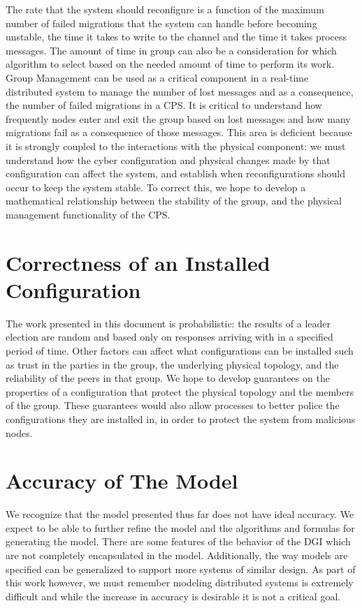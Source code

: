  The rate that the system should reconfigure is a function of the maximum number of failed migrations that the system can handle before becoming unstable, the time it takes to write to the channel and the time it takes process messages. The amount of time in group can also be a consideration for which algorithm to select based on the needed amount of time to perform its work. Group Management can be used as a critical component in a real-time distributed system to manage the number of lost messages and as a consequence, the number of failed migrations in a CPS. It is critical to understand how frequently nodes enter and exit the group based on lost messages and how many migrations fail as a consequence of those messages. This area is deficient because it is strongly coupled to the interactions with the physical component: we must understand how the cyber configuration and physical changes made by that configuration can affect the system, and establish when reconfigurations should occur to keep the system stable. To correct this, we hope to develop a mathematical relationship between the stability of the group, and the physical management functionality of the CPS.

\section{Correctness of an Installed Configuration}

 The work presented in this document is probabilistic: the results of a leader election are random and based only on responses arriving with in a specified period of time. Other factors can affect what configurations can be installed such as trust in the parties in the group, the underlying physical topology, and the reliability of the peers in that group. We hope to develop guarantees on the properties of a configuration that protect the physical topology and the members of the group. These guarantees would also allow processes to better police the configurations they are installed in, in order to protect the system from malicious nodes.

\section{Accuracy of The Model}

We recognize that the model presented thus far does not have ideal accuracy. We expect to be able to further refine the model and the algorithms and formulas for generating the model. There are some features of the behavior of the DGI which are not completely encapsulated in the model. Additionally, the way models are specified can be generalized to support more systems of similar design. As part of this work however, we must remember modeling distributed systems is extremely difficult and while the increase in accuracy is desirable it is not a critical goal.

